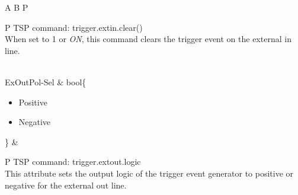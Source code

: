 \documentclass[openany]{article}
\begin{document}
\begin{longtable}{A B P}
\begin{tabular}{P}
					TSP command: trigger.extin.clear() \\
					When set to 1 or \emph{ON}, this command clears the trigger event on the external in line.
				\end{tabular} \\ \hline
		ExOutPol-Sel & bool\{\begin{itemize}[noitemsep]
					\small
					\item[] Positive
					\item[] Negative
				\end{itemize}\} & 
				\begin{tabular}{P}
					TSP command: trigger.extout.logic \\
					This attribute sets the output logic of the trigger event generator to positive or negative for the external out line.
				\end{tabular} \\


\end{longtable}
\end{document}
